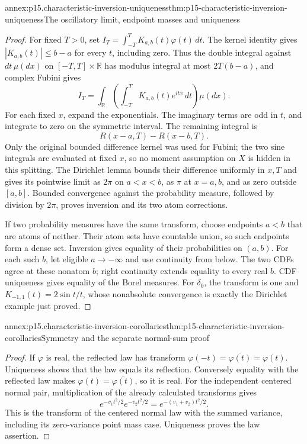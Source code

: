 \begin{annexitem}{annex:p15.characteristic-inversion-uniqueness}{thm:p15-characteristic-inversion-uniqueness}{The oscillatory limit, endpoint masses and uniqueness}
\begin{proof}
For fixed \(T>0\), set
\(I_T=\int_{-T}^T K_{a,b}(t)\varphi(t)\,dt\).
The kernel identity gives \(|K_{a,b}(t)|\leq b-a\)
for every \(t\), including zero.
Thus the double integral against \(dt\,\mu(dx)\) on
\([-T,T]\times\mathbb R\) has modulus integral at most
\(2T(b-a)\), and complex Fubini gives
\[
 I_T=\int_{\mathbb R}\left(
            \int_{-T}^T K_{a,b}(t)e^{itx}\,dt\right)\mu(dx).
\]
For each fixed \(x\), expand the exponentials.
The imaginary terms are odd in \(t\), and integrate
to zero on the symmetric interval. The remaining
integral is
\[
 R(x-a,T)-R(x-b,T).
\]
Only the original bounded difference kernel was used
for Fubini; the two sine integrals are evaluated at
fixed \(x\), so no moment assumption on \(X\) is hidden
in this splitting.
The Dirichlet lemma bounds their difference uniformly
in \(x,T\) and gives its pointwise limit as \(2\pi\)
on \(a<x<b\), as \(\pi\) at \(x=a,b\), and as zero
outside \([a,b]\). Bounded convergence against the
probability measure, followed by division by \(2\pi\),
proves inversion and its two atom corrections.

If two probability measures have the same transform,
choose endpoints \(a<b\) that are atoms of neither.
Their atom sets have countable union, so such endpoints
form a dense set. Inversion gives equality of their
probabilities on \((a,b)\).
For each such \(b\), let eligible \(a\to-\infty\)
and use continuity from below. The two CDFs agree at
these nonatom \(b\); right continuity extends equality
to every real \(b\). CDF uniqueness gives equality of
the Borel measures.
For \(\delta_0\), the transform is one and
\(K_{-1,1}(t)=2\sin t/t\), whose nonabsolute convergence
is exactly the Dirichlet example just proved.
\end{proof}
\end{annexitem}

\begin{annexitem}{annex:p15.characteristic-inversion-corollaries}{thm:p15-characteristic-inversion-corollaries}{Symmetry and the separate normal-sum proof}
\begin{proof}
If \(\varphi\) is real, the reflected law has transform
\(\varphi(-t)=\overline{\varphi(t)}=\varphi(t)\).
Uniqueness shows that the law equals its reflection.
Conversely equality with the reflected law makes
\(\varphi(t)=\overline{\varphi(t)}\), so it is real.
For the independent centered normal pair, multiplication
of the already calculated transforms gives
\[
 e^{-v_1t^2/2}e^{-v_2t^2/2}
                   =e^{-(v_1+v_2)t^2/2}.
\]
This is the transform of the centered normal law with
the summed variance, including its zero-variance point
mass case. Uniqueness proves the law assertion.
\end{proof}
\end{annexitem}

